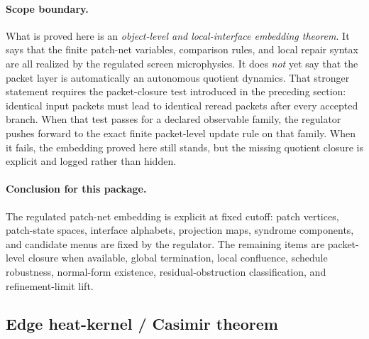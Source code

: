 \documentclass[11pt]{article}
\begin{document}
\paragraph{Scope boundary.}
What is proved here is an \emph{object-level and local-interface embedding theorem}. It says
that the finite patch-net variables, comparison rules, and local repair syntax are all realized
by the regulated screen microphysics. It does \emph{not} yet say that the packet layer is
automatically an autonomous quotient dynamics. That stronger statement requires the
packet-closure test introduced in the preceding section: identical input packets must lead to
identical reread packets after every accepted branch. When that test passes for a declared
observable family, the regulator pushes forward to the exact finite packet-level update rule on
that family. When it fails, the embedding proved here still stands, but the missing quotient
closure is explicit and logged rather than hidden.

\paragraph{Conclusion for this package.}
The regulated patch-net embedding is explicit at fixed cutoff: patch vertices, patch-state spaces, interface alphabets, projection maps, syndrome components, and candidate menus are fixed by the regulator. The remaining items are packet-level closure when available, global termination, local confluence, schedule robustness, normal-form existence, residual-obstruction classification, and refinement-limit lift.

\subsection{Edge heat-kernel / Casimir theorem}\label{sec:microphysics-feeds-e24}
\end{document}
